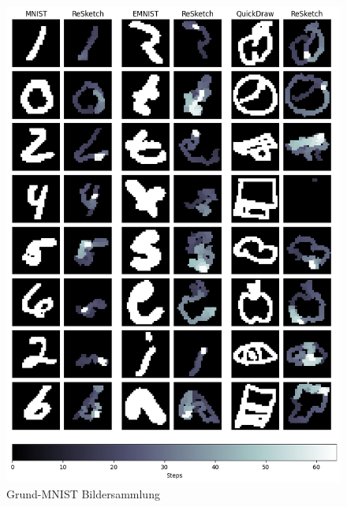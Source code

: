 \newpage
\begin{figure}[!ht]
    \centering
    \includegraphics[width=\textwidth]{images/resultate/base-mnist.png}
    \caption{Grund-MNIST Bildersammlung}
    \label{fig:Grund-MNIST}
\end{figure}


